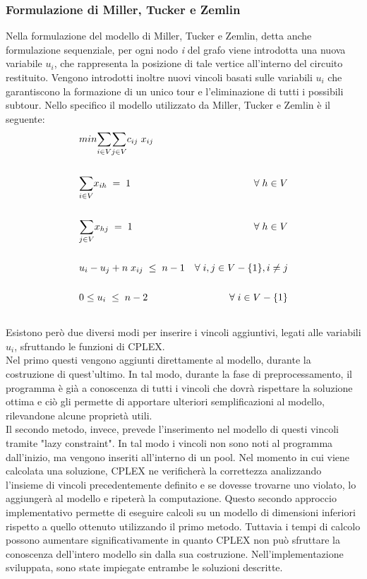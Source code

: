 \subsubsection{Formulazione di Miller, Tucker e Zemlin}
Nella formulazione del modello di Miller, Tucker e Zemlin, detta anche formulazione sequenziale, per ogni nodo \textit{i} del grafo viene introdotta una nuova variabile $u_i$, che rappresenta la posizione di tale vertice all'interno del circuito restituito. Vengono introdotti inoltre nuovi vincoli basati sulle variabili $u_i$ che garantiscono la formazione di un unico tour e l'eliminazione di tutti i possibili subtour. Nello specifico il modello utilizzato da Miller, Tucker e Zemlin è il seguente\cite{COMPACT_CITE}:
\begin{align}
& min \underset{i\in V}\sum{}\underset{j\in V}\sum{c_{ij}\; x_{ij}} \\ \notag \\
& \underset{i\in V}\sum{x_{ih}}\; =\; 1 & \forall\; h\in V \\ \notag \\
& \underset{j\in V}\sum{x_{hj}}\; =\; 1 & \forall\; h\in V \\ \notag \\
& u_i-u_j+n\; x_{ij}\;\leq\; n-1 & \forall\; i,j\in V-\{ 1\} , i\neq j \\ \notag \\
& 0\leq u_i\;\leq\; n-2 & \forall\; i\in V-\{ 1\} \\ \notag 
\end{align}
Esistono però due diversi modi per inserire i vincoli aggiuntivi, legati alle variabili $u_i$,  sfruttando le funzioni di CPLEX.\\
Nel primo questi vengono aggiunti direttamente al modello, durante la costruzione di quest'ultimo. In tal modo, durante la fase di preprocessamento, il programma è già a conoscenza di tutti i vincoli che dovrà rispettare la soluzione ottima e ciò gli permette di apportare ulteriori semplificazioni al modello, rilevandone alcune proprietà utili.\\
Il secondo metodo, invece, prevede l'inserimento nel modello di questi vincoli tramite "lazy constraint". In tal modo i vincoli non sono noti al programma dall'inizio, ma vengono inseriti all'interno di un pool. Nel momento in cui viene calcolata una soluzione, CPLEX ne verificherà la correttezza analizzando l'insieme di vincoli precedentemente definito e se dovesse trovarne uno violato, lo aggiungerà al modello e ripeterà la computazione.
 Questo secondo approccio implementativo permette di eseguire calcoli su un modello di dimensioni inferiori rispetto a quello ottenuto utilizzando il primo metodo. Tuttavia i tempi di calcolo possono aumentare significativamente in quanto CPLEX non può sfruttare la conoscenza dell'intero modello sin dalla sua costruzione. 
Nell'implementazione sviluppata, sono state impiegate entrambe le soluzioni descritte.

